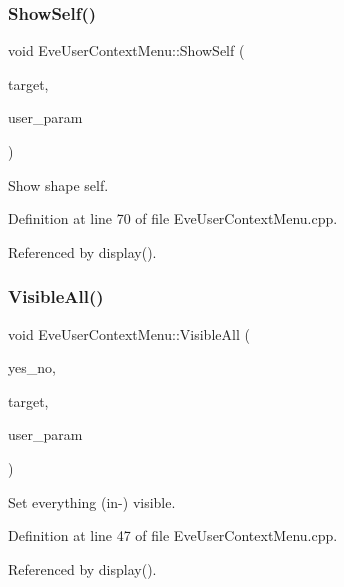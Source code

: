\subsubsection{\texorpdfstring{Show\+Self()}{ShowSelf()}}
{\footnotesize\ttfamily void Eve\+User\+Context\+Menu\+::\+Show\+Self (\begin{DoxyParamCaption}\item[{\hyperlink{class_t_object}{T\+Object} $\ast$}]{target,  }\item[{void $\ast$}]{user\+\_\+param }\end{DoxyParamCaption})}



Show shape self. 



Definition at line 70 of file Eve\+User\+Context\+Menu.\+cpp.



Referenced by display().

\hypertarget{class_d_d4hep_1_1_eve_user_context_menu_ac41f26a1ef86468fb37da4a1fad9b4df}{}\label{class_d_d4hep_1_1_eve_user_context_menu_ac41f26a1ef86468fb37da4a1fad9b4df} 
\subsubsection{\texorpdfstring{Visible\+All()}{VisibleAll()}}
{\footnotesize\ttfamily void Eve\+User\+Context\+Menu\+::\+Visible\+All (\begin{DoxyParamCaption}\item[{bool}]{yes\+\_\+no,  }\item[{\hyperlink{class_t_object}{T\+Object} $\ast$}]{target,  }\item[{void $\ast$}]{user\+\_\+param }\end{DoxyParamCaption})}



Set everything (in-\/) visible. 



Definition at line 47 of file Eve\+User\+Context\+Menu.\+cpp.



Referenced by display().

\hypertarget{class_d_d4hep_1_1_eve_user_context_menu_acf1a858a9cb9c8ba26bd351300a53a3c}{}\label{class_d_d4hep_1_1_eve_user_context_menu_acf1a858a9cb9c8ba26bd351300a53a3c} 
